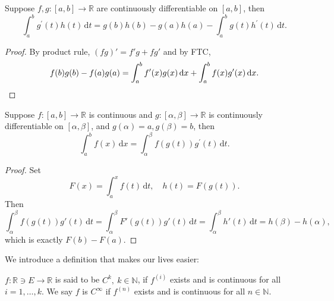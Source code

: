 \begin{corollary}
    Suppose $f,g:[a,b]\to\mathbb R$ are continuously differentiable on $[a,b]$, then
    $$\int_a^bg^\prime(t)h(t)\,\mathrm dt=g(b)h(b)-g(a)h(a)-\int_a^bg(t)h^\prime(t)\,\mathrm dt.$$
\end{corollary}
\begin{proof}
    By product rule, $ (fg)'=f'g+fg' $ and by FTC,
    \[
        f(b)g(b)-f(a)g(a)=\int_{a}^{b} f'(x)g(x) \,\mathrm{d}x + \int_{a}^{b} f(x)g'(x) \,\mathrm{d}x.\qedhere
    \]
\end{proof}
\begin{corollary}
    Suppose $f:[a,b]\to\mathbb R$ is continuous and $g:[\alpha,\beta]\to\mathbb R$ is continuously differentiable on $ [\alpha,\beta] $, and $g(\alpha)=a, g(\beta)=b$, then
    $$\int_a^bf(x)\,\mathrm dx=\int_\alpha^\beta f(g(t))g^\prime(t)\,\mathrm dt.$$
\end{corollary}
\begin{proof}
    Set 
    \[
        F(x) = \int_{a}^{x} f(t) \,\mathrm{d}t,\quad h(t) = F(g(t)).
    \]
    Then
    \[
        \int_{\alpha}^{\beta} f(g(t))g'(t) \,\mathrm{d}t = \int_{\alpha}^{\beta} F'(g(t))g'(t) \,\mathrm{d}t = \int_{\alpha}^{\beta} h'(t) \,\mathrm{d}t = h(\beta)-h(\alpha),
    \]
    which is exactly $ F(b)-F(a) $.
\end{proof}

We introduce a definition that makes our lives easier:
\begin{definition}
    $ f: \mathbb{R} \ni E \to \mathbb{R}  $ is said to be $ C^k,\ k\in \mathbb{N} $, if $ f^{(i)} $ exists and is continuous for all $i=1,\dots,k$. We say $f$ is $ C^\infty $ if $ f^{(n)} $ exists and is continuous for all $n\in \mathbb{N}$.
\end{definition}

